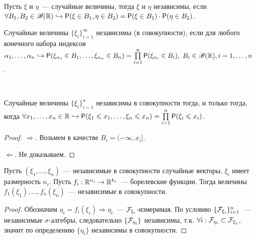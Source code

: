 \begin{definition}
	Пусть $\xi$ и $\eta$~--- случайные величины, тогда $\xi$ и $\eta$ независимы, если $\forall B_1, B_2 \in \mathscr{B}(\mathbb{R}) \hookrightarrow  \mathsf{P}(\xi \in B_1, \eta \in B_2) = \mathsf{P}(\xi \in B_1)\cdot\mathsf{P}(\eta \in B_2)$.
\end{definition}

\begin{definition}
	Случайные величины $\{\xi_i\}_{i = 1}^\infty$ независимы (в совокупности), если для любого конечного набора индексов $\alpha_1, \ldots, \alpha_n \hookrightarrow \mathsf{P}(\xi_{\alpha_1} \in B_1, \ldots, \xi_{\alpha_n} \in B_n) = \prod\limits_{i = 1}^n\mathsf{P}(\xi_{\alpha_i} \in B_i),\; B_i \in \mathscr{B}(\mathbb{R}), i = 1, \ldots, n$.
\end{definition}

\begin{theorem}~

	Случайные величины $\{\xi_i\}_{i = 1}^n$ независимы в совокупности тогда, и только тогда, когда $\forall x_1, \ldots, x_n \in \mathbb{R} \hookrightarrow \mathsf{P}(\xi_1 \leqslant x_1, \ldots, \xi_n \leqslant x_n) = \prod\limits_{i = 1}^n\mathsf{P}(\xi_i \leqslant x_i)$.
	\begin{proof}
		$\Rightarrow$. Возьмем в качестве $B_i = (-\infty, x_i]$.
		
		$\Leftarrow$. Не доказываем.
	\end{proof}
\end{theorem}

\begin{theorem}
	Пусть $(\xi_1, \ldots, \xi_n)$~--- независимые в совокупности случайные векторы, $\xi_i$ имеет размерность $n_i$. Пусть $f_i: \mathbb{R}^{n_i} \rightarrow \mathbb{R}^{k_i}$~--- борелевские функции. Тогда величины $f_1(\xi_1), \ldots, f_n(\xi_n)$~--- независимые в совокупности.
	\begin{proof}
		Обозначим $\eta_i = f_i(\xi_i) \Rightarrow \eta_i$~--- $\mathcal{F}_{\xi_i}$-измеримая. По условию $\{\mathcal{F}_{\xi_i}\}_{i = 1}^n$~--- независимые $\sigma$-алгебры, следовательно $\{\mathcal{F}_{\eta_i}\}$ независимы, т.к. $\forall i : \mathcal{F}_{\eta_i} \subset \mathcal{F}_{\xi_i}$, значит по определению $\{\eta_i\}$ независимы в совокупности.
	\end{proof}
\end{theorem}
